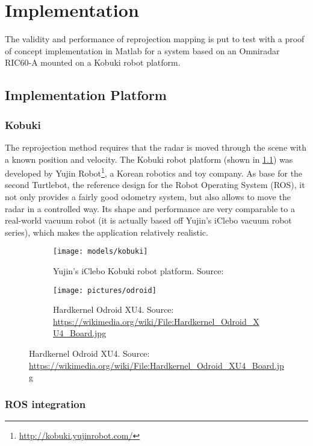 \chapter{Implementation}\label{implementation}

The validity and performance of reprojection mapping is put to test with a proof of concept implementation in Matlab for a system based on an Omniradar RIC60-A mounted on a Kobuki robot platform.

\section{Implementation Platform}\label{implementation-platform}

\subsection{Kobuki}\label{kobuki}

The reprojection method requires that the radar is moved through the scene with a known position and velocity. The Kobuki robot platform (shown in \cref{fig:kobuki}) was developed by Yujin Robot\footnote{\url{http://kobuki.yujinrobot.com/}}, a Korean robotics and toy company. As base for the second Turtlebot, the reference design for the Robot Operating System (ROS), it not only provides a fairly good odometry system, but also allows to move the radar in a controlled way. Its shape and performance are very comparable to a real-world vacuum robot (it is actually based off Yujin's iClebo vacuum robot series), which makes the application relatively realistic.

\begin{figure}[htbp]
    \centering
    \begin{subfigure}{0.45\textwidth}
        \texttt{[image: models/kobuki]}
        \caption{Yujin's iClebo Kobuki robot platform. Source: \cite{DesignK2013}}
        \label{fig:kobuki}
    \end{subfigure}
    \hfill
    \begin{subfigure}{0.45\textwidth}
        \texttt{[image: pictures/odroid]}
        \caption{Hardkernel Odroid XU4. Source: \url{https://wikimedia.org/wiki/File:Hardkernel_Odroid_XU4_Board.jpg}}
        \label{fig:odroid}
    \end{subfigure}
\end{figure}

\subsection{ROS integration}\label{ros-integration}

